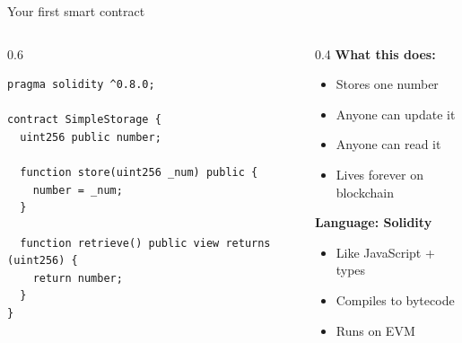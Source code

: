 \ifdefined\PRESENTATION\else\PassOptionsToClass{handout}{beamer}\fi\documentclass[aspectratio=169, lualatex]{beamer}
\begin{document}
\begin{frame}[fragile]{Your first smart contract}
	\begin{columns}[c]
		\begin{column}{0.6\textwidth}
			\scriptsize
			\begin{verbatim}
pragma solidity ^0.8.0;

contract SimpleStorage {
  uint256 public number;

  function store(uint256 _num) public {
    number = _num;
  }

  function retrieve() public view returns (uint256) {
    return number;
  }
}
\end{verbatim}
		\end{column}
		\begin{column}{0.4\textwidth}
			\textbf{What this does:}
			\begin{itemize}
				\item Stores one number
				\item Anyone can update it
				\item Anyone can read it
				\item Lives forever on blockchain
			\end{itemize}
			\textbf{Language: Solidity}
			\begin{itemize}
				\item Like JavaScript + types
				\item Compiles to bytecode
				\item Runs on EVM
			\end{itemize}
		\end{column}
	\end{columns}
\end{frame}
\end{document}
